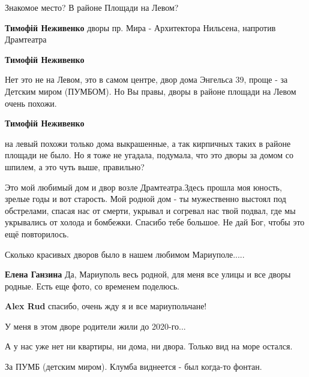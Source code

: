  
 
 
 
 

\qqSecCmt


Знакомое место? В районе Площади на Левом?

\begin{itemize} %
\textbf{Тимофій Неживенко} дворы пр. Мира - Архитектора Нильсена, напротив Драмтеатра

\textbf{Тимофій Неживенко} 

Нет это не на Левом, это в самом центре, двор дома Энгельса 39, проще - за
Детским миром (ПУМБОМ). Но Вы правы, дворы в районе площади на Левом очень
похожи.

\textbf{Тимофій Неживенко} 

на левый похожи только дома выкрашенные, а так кирпичных таких в районе площади
не было. Но я тоже не угадала, подумала, что это дворы за домом со шпилем, а
это чуть выше, правильно?

\end{itemize} %


Это мой любимый дом и двор возле Драмтеатра.Здесь прошла моя юность, зрелые
годы и вот старость. Мой родной дом - ты мужественно выстоял под обстрелами,
спасая нас от смерти, укрывал и согревал нас твой подвал, где мы укрывались от
холода и бомбежки. Спасибо тебе большое. Не дай Бог, чтобы это ещё
повторилось.


Сколько красивых дворов было в нашем любимом Мариуполе.....

\begin{itemize} %
\textbf{Елена Ганзина} Да, Мариуполь весь родной, для меня все улицы и все дворы родные. Есть еще фото, со временем поделюсь.

\textbf{Alex Rud} спасибо, очень жду я и все мариупольчане!
\end{itemize} %


У меня в этом дворе родители жили до 2020-го...


А у нас уже нет ни квартиры, ни дома, ни двора. Только вид на море остался.


За ПУМБ (детским миром). Клумба виднеется - был когда-то фонтан.
